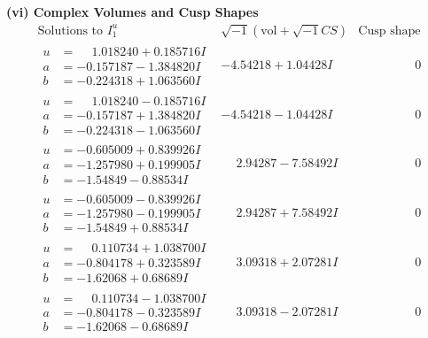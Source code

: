 \documentclass[1p]{elsarticle_modified}
\theoremstyle{definition}
\newcommand{\I}{\sqrt{-1}}
\begin{document}
\newpage\flushleft \textbf{(vi) Complex Volumes and Cusp Shapes}
$$\begin{array}{c|c|c}  
\text{Solutions to }I^u_{1}& \I (\text{vol} + \sqrt{-1}CS) & \text{Cusp shape}\\
 \hline 
\begin{aligned}
u &= \phantom{-}1.018240 + 0.185716 I \\
a &= -0.157187 - 1.384820 I \\
b &= -0.224318 + 1.063560 I\end{aligned}
 & -4.54218 + 1.04428 I & \phantom{-0.000000 } 0 \\ \hline\begin{aligned}
u &= \phantom{-}1.018240 - 0.185716 I \\
a &= -0.157187 + 1.384820 I \\
b &= -0.224318 - 1.063560 I\end{aligned}
 & -4.54218 - 1.04428 I & \phantom{-0.000000 } 0 \\ \hline\begin{aligned}
u &= -0.605009 + 0.839926 I \\
a &= -1.257980 + 0.199905 I \\
b &= -1.54849 - 0.88534 I\end{aligned}
 & \phantom{-}2.94287 - 7.58492 I & \phantom{-0.000000 } 0 \\ \hline\begin{aligned}
u &= -0.605009 - 0.839926 I \\
a &= -1.257980 - 0.199905 I \\
b &= -1.54849 + 0.88534 I\end{aligned}
 & \phantom{-}2.94287 + 7.58492 I & \phantom{-0.000000 } 0 \\ \hline\begin{aligned}
u &= \phantom{-}0.110734 + 1.038700 I \\
a &= -0.804178 + 0.323589 I \\
b &= -1.62068 + 0.68689 I\end{aligned}
 & \phantom{-}3.09318 + 2.07281 I & \phantom{-0.000000 } 0 \\ \hline\begin{aligned}
u &= \phantom{-}0.110734 - 1.038700 I \\
a &= -0.804178 - 0.323589 I \\
b &= -1.62068 - 0.68689 I\end{aligned}
 & \phantom{-}3.09318 - 2.07281 I & \phantom{-0.000000 } 0 \\ \hline\begin{aligned}

\end{aligned}
\end{array}$$
\end{document}
